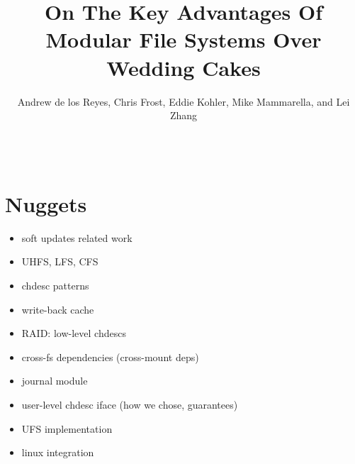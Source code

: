 \documentclass[10pt,twocolumn,letterpaper]{article}
\begin{document}
\normalsize

\title{\sffamily\textbf{On The Key Advantages Of Modular File Systems Over Wedding Cakes}}


\author{\sffamily Andrew de los Reyes, Chris Frost, Eddie Kohler, Mike
Mammarella, and Lei Zhang \\
\noalign{\vskip2pt}
 \\
\noalign{\vskip2pt}
 \\
\noalign{\vskip-.25in}
\null}
\date{}
\maketitle

\def\assast{\raise.2ex\hbox{$^\ast$}}



\section{Nuggets}

\begin{itemize}
\item soft updates related work
\item UHFS, LFS, CFS
\item chdesc patterns
\item write-back cache
\item RAID: low-level chdescs
\item cross-fs dependencies (cross-mount deps)
\item journal module
\item user-level chdesc iface (how we chose, guarantees)
\item UFS implementation
\item linux integration
\end{itemize}
\end{document}
